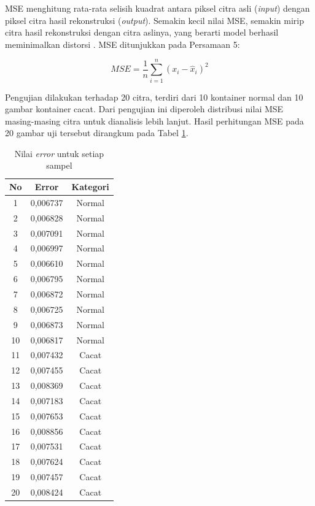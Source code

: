 MSE menghitung rata-rata selisih kuadrat antara piksel citra asli
(\textit{input}) dengan piksel citra hasil rekonstruksi
(\textit{output}). Semakin
kecil nilai MSE, semakin mirip citra hasil rekonstruksi dengan citra
aslinya, yang berarti model berhasil meminimalkan distorsi
\citep{27}. MSE ditunjukkan pada Persamaan 5:

\begin{equation}
  MSE = \frac{1}{n} \sum_{i=1}^{n} (x_i - \hat{x}_i)^2
\end{equation}

Pengujian dilakukan terhadap 20 citra, terdiri dari 10 kontainer
normal dan 10 gambar kontainer cacat. Dari pengujian ini diperoleh
distribusi nilai MSE masing-masing citra untuk dianalisis lebih
lanjut. Hasil perhitungan MSE pada 20 gambar uji tersebut dirangkum
pada Tabel \ref{tab:error-samples}.

\begin{table}[H]
  \centering
  \caption{Nilai \textit{error} untuk setiap sampel}
  \label{tab:error-samples}
  \begin{tabular}{c@{\hspace{2cm}}c@{\hspace{2cm}}c}
    \toprule
    \textbf{No} & \textbf{Error} & \textbf{Kategori} \\
    \midrule
    1  & 0,006737 & Normal \\
    2  & 0,006828 & Normal \\
    3  & 0,007091 & Normal \\
    4  & 0,006997 & Normal \\
    5  & 0,006610 & Normal \\
    6  & 0,006795 & Normal \\
    7  & 0,006872 & Normal \\
    8  & 0,006725 & Normal \\
    9  & 0,006873 & Normal \\
    10 & 0,006817 & Normal \\
    11 & 0,007432 & Cacat \\
    12 & 0,007455 & Cacat \\
    13 & 0,008369 & Cacat \\
    14 & 0,007183 & Cacat \\
    15 & 0,007653 & Cacat \\
    16 & 0,008856 & Cacat \\
    17 & 0,007531 & Cacat \\
    18 & 0,007624 & Cacat \\
    19 & 0,007457 & Cacat \\
    20 & 0,008424 & Cacat \\
    \bottomrule
  \end{tabular}
\end{table}

